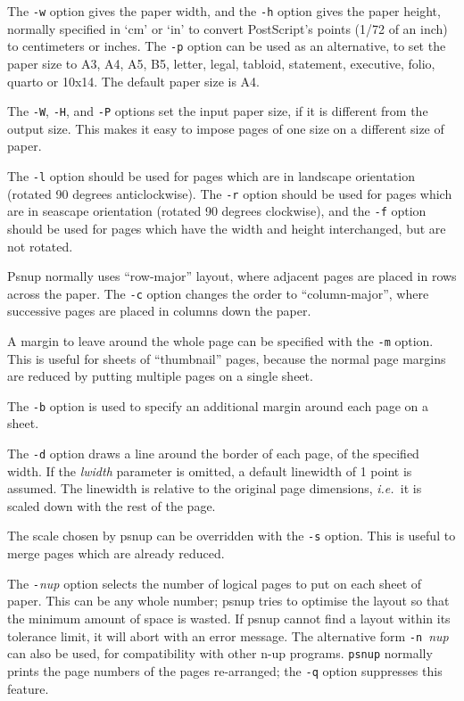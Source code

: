 \documentclass[twoside,11pt]{starlink}
\begin{document}
\begin{itemize}
The \texttt{-w} option gives the paper width, and the \texttt{-h} option
gives the paper height, normally specified in `cm' or `in' to convert
PostScript's points (1/72 of an inch) to centimeters or inches. The
\texttt{-p} option can be used as an alternative, to set the paper size
to A3, A4, A5, B5, letter, legal, tabloid, statement, executive,
folio, quarto or 10x14. The default paper size is A4.

The \texttt{-W}, \texttt{-H}, and \texttt{-P} options set the input paper size,
if it is different from the output size. This makes it easy to impose
pages of one size on a different size of paper.

The \texttt{-l} option should be used for pages which are in landscape
orientation (rotated 90 degrees anticlockwise). The \texttt{-r} option
should be used for pages which are in seascape orientation (rotated 90
degrees clockwise), and the \texttt{-f} option should be used for pages
which have the width and height interchanged, but are not rotated.

Psnup normally uses ``row-major'' layout, where adjacent pages are
placed in rows across the paper. The \texttt{-c} option changes the order
to ``column-major'', where successive pages are placed in columns down
the paper.

A margin to leave around the whole page can be specified with the \texttt{-m} option. This is useful for sheets of ``thumbnail'' pages, because
the normal page margins are reduced by putting multiple pages on a
single sheet.

The \texttt{-b} option is used to specify an additional margin around
each page on a sheet.

The \texttt{-d} option draws a line around the border of each page, of
the specified width. If the \emph{lwidth} parameter is omitted, a
default linewidth of 1 point is assumed. The linewidth is relative to
the original page dimensions, \emph{i.e.\ }it is scaled down with the
rest of the page.

The scale chosen by psnup can be overridden with the \texttt{-s} option.
This is useful to merge pages which are already reduced.

The \texttt{-}\emph{nup} option selects the number of logical pages to put
on each sheet of paper. This can be any whole number; psnup tries to
optimise the layout so that the minimum amount of space is wasted. If
psnup cannot find a layout within its tolerance limit, it will abort
with an error message. The alternative form \texttt{-n }\emph{nup} can
also be used, for compatibility with other n-up programs. \texttt{psnup}
normally prints the page numbers of the pages re-arranged; the \texttt{-q} option suppresses this feature.


\end{itemize}
\end{document}
